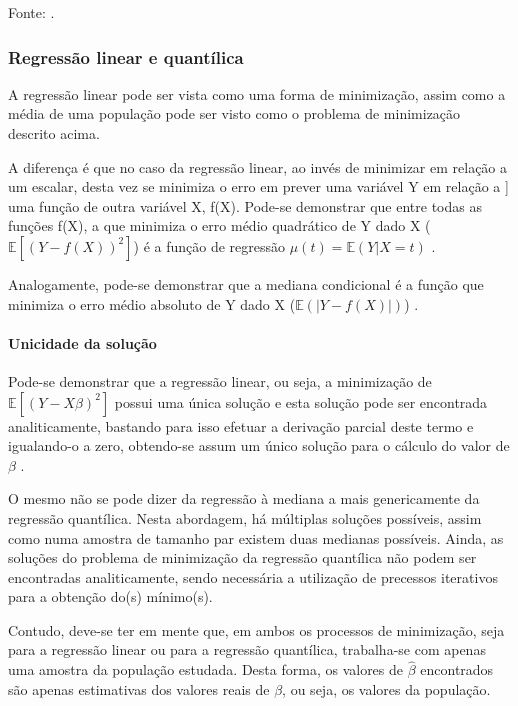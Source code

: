 \documentclass[a4paper, 12pt]{article}
\let\oldparagraph\paragraph
\renewcommand{\paragraph}[1]{\oldparagraph{#1}\mbox{}}
\newcommand{\bcenter}{\begin{center}}
\newcommand{\ecenter}{\end{center}}
\begin{document}
\bcenter Fonte: \textcite{qr}. \ecenter

\hypertarget{regressao-linear-e-quantilica}{%
\subsubsection{Regressão linear e
quantílica}\label{regressao-linear-e-quantilica}}

A regressão linear pode ser vista como uma forma de minimização, assim
como a média de uma população pode ser visto como o problema de
minimização descrito acima.

A diferença é que no caso da regressão linear, ao invés de minimizar em
relação a um escalar, desta vez se minimiza o erro em prever uma
variável Y em relação a {]} uma função de outra variável X, f(X).
Pode-se demonstrar que entre todas as funções f(X), a que minimiza o
erro médio quadrático de Y dado X (\(\mathbb{E}[(Y - f(X))^2]\)) é a
função de regressão \(\mu(t) = \mathbb{E}(Y|X=t)\)
\autocite[49-50]{matloff2017}.

Analogamente, pode-se demonstrar que a mediana condicional é a função
que minimiza o erro médio absoluto de Y dado X
(\(\mathbb{E}(|Y-f(X)|)\)) \autocite[260-261]{matloff2017}.

\hypertarget{unicidade-da-solucao}{%
\paragraph{Unicidade da solução}\label{unicidade-da-solucao}}

Pode-se demonstrar que a regressão linear, ou seja, a minimização de
\(\mathbb{E}[(Y - X\beta)^2]\) possui uma única solução e esta solução
pode ser encontrada analiticamente, bastando para isso efetuar a
derivação parcial deste termo e igualando-o a zero, obtendo-se assum um
único solução para o cálculo do valor de \(\beta\)
\autocite[ver][49-50]{matloff2017}.

O mesmo não se pode dizer da regressão à mediana a mais genericamente da
regressão quantílica. Nesta abordagem, há múltiplas soluções possíveis,
assim como numa amostra de tamanho par existem duas medianas possíveis.
Ainda, as soluções do problema de minimização da regressão quantílica
não podem ser encontradas analiticamente, sendo necessária a utilização
de precessos iterativos para a obtenção do(s) mínimo(s).

Contudo, deve-se ter em mente que, em ambos os processos de minimização,
seja para a regressão linear ou para a regressão quantílica, trabalha-se
com apenas uma amostra da população estudada. Desta forma, os valores de
\(\hat \beta\) encontrados são apenas estimativas dos valores reais de
\(\beta\), ou seja, os valores da população.
\end{document}
